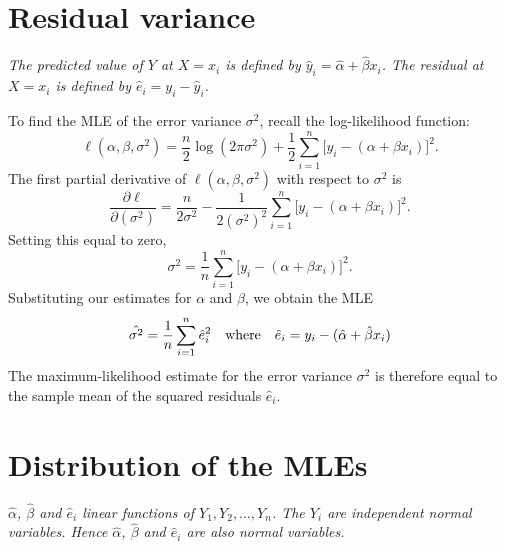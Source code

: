 \section{Residual variance}
\bit
\it The \emph{predicted value} of $Y$ at $X=x_i$ is defined by $\hat{y}_i = \hat{\alpha} + \hat{\beta}x_i$.
\it The \emph{residual} at $X=x_i$ is defined by $\hat{e}_i = y_i - \hat{y}_i$.
\eit


To find the MLE of the error variance $\sigma^2$, recall the log-likelihood function:
\[
\ell(\alpha,\beta,\sigma^2)
	= \frac{n}{2}\log(2\pi\sigma^2) + \frac{1}{2}\sum_{i=1}^n \big[y_i-(\alpha+\beta x_i)\big]^2.
\]
The first partial derivative of $\ell(\alpha,\beta,\sigma^2)$ with respect to $\sigma^2$ is
\[
\frac{\partial\ell}{\partial(\sigma^2)} 
	= \frac{n}{2\sigma^2} - \frac{1}{2(\sigma^2)^2}\sum_{i=1}^n \big[y_i-(\alpha+\beta x_i)\big]^2.
\]
Setting this equal to zero,
\[
\sigma^2 = \frac{1}{n}\sum_{i=1}^n \big[y_i-(\alpha+\beta x_i)\big]^2.
\]
Substituting our estimates for $\alpha$ and $\beta$, we obtain the MLE
\[
\hat{\sigma^2} = \frac{1}{n}\sum_{i=1}^n \hat{e}_i^2 \text{\quad where\quad} \hat{e}_i = y_i-(\hat{\alpha}+\hat{\beta} x_i)\big.
\]
The maximum-likelihood estimate for the error variance $\sigma^2$ is therefore equal to the sample mean of the squared residuals $\hat{e}_i$.



\section{Distribution of the MLEs}
\bit
\it $\hat{\alpha}$, $\hat{\beta}$ and $\hat{e}_i$ linear functions of $Y_1,Y_2,\ldots,Y_n$.
\it The $Y_i$ are independent normal variables.
\it Hence $\hat{\alpha}$, $\hat{\beta}$ and $\hat{e}_i$ are also normal variables.
\eit

